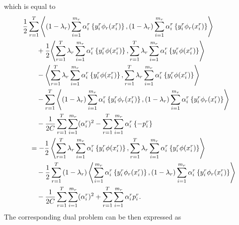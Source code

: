 which is equal to
\begin{equation}\nonumber
    \begin{aligned}
        & \frac{1}{2} \sum_{r= 1}^T{\left\langle (1-\lambda_r)\sum_{i=1}^{m_r} {\alpha_i^r} \left\lbrace y_i^r \phi_r({x}_i^r) \right\rbrace, (1-\lambda_r)\sum_{i=1}^{m_r} {\alpha_i^r} \left\lbrace y_i^r \phi_r({x}_i^r) \right\rbrace \right\rangle}  \\
        &\qquad + \frac{1}{2} {\left\langle \sum_{r= 1}^T \lambda_r \sum_{i=1}^{m_r} {\alpha_i^r} \left\lbrace y_i^r \phi({x}_i^r) \right\rbrace, \sum_{r= 1}^T \lambda_r \sum_{i=1}^{m_r} {\alpha_i^r} \left\lbrace y_i^r \phi({x}_i^r) \right\rbrace \right\rangle} \\
        &\qquad - \left\langle  \sum_{r= 1}^T \lambda_r \sum_{i=1}^{m_r} {\alpha_i^r} \left\lbrace y_i^r \phi({x}_i^r) \right\rbrace,  \sum_{r= 1}^T \lambda_r \sum_{i=1}^{m_r} {\alpha_i^r} \left\lbrace y_i^r \phi({x}_i^r) \right\rbrace \right\rangle \\
        &\qquad -  \sum_{r= 1}^T {\left\langle (1-\lambda_r) \sum_{i=1}^{m_r} {\alpha_i^r} \left\lbrace y_i^r \phi_r({x}_i^r) \right\rbrace, (1-\lambda_r) \sum_{i=1}^{m_r} {\alpha_i^r} \left\lbrace y_i^r \phi_r({x}_i^r) \right\rbrace \right\rangle} \\
        &\qquad - \frac{1}{2C} \sum_{r=1}^T \sum_{i=1}^{m_r} (\alpha_i^r)^2 -  \sum_{r= 1}^T \sum_{i=1}^{m_r} \alpha_i^r \left\lbrace - p_{i}^r  \right\rbrace  \\
        &\quad= - \frac{1}{2} \left\langle  \sum_{r= 1}^T  \lambda_r \sum_{i=1}^{m_r} {\alpha_i^r} \left\lbrace y_i^r \phi({x}_i^r) \right\rbrace,  \sum_{r= 1}^T \lambda_r \sum_{i=1}^{m_r} {\alpha_i^r} \left\lbrace y_i^r \phi({x}_i^r) \right\rbrace \right\rangle \\
        &\qquad - \frac{1}{2} \sum_{r= 1}^T {(1-\lambda_r) \left\langle \sum_{i=1}^{m_r} {\alpha_i^r} \left\lbrace y_i^r \phi_r({x}_i^r) \right\rbrace, (1-\lambda_r) \sum_{i=1}^{m_r} {\alpha_i^r} \left\lbrace y_i^r \phi_r({x}_i^r) \right\rbrace \right\rangle} \\
        &\qquad - \frac{1}{2C} \sum_{r=1}^T \sum_{i=1}^{m_r} (\alpha_i^r)^2  +  \sum_{r= 1}^T \sum_{i=1}^{m_r} \alpha_i^r  p_{i}^r .
    \end{aligned}
\end{equation}
The corresponding dual problem can be then expressed as
